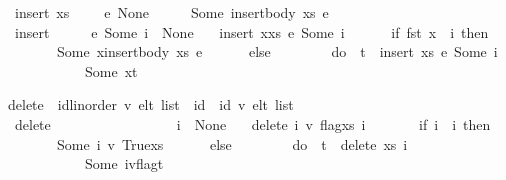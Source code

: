 \documentclass[acmlarge,review,anonymous]{acmart}\settopmatter{printfolios=true}
\begin{document}
\begin{isabellebody}
\ \ {\isachardoublequoteopen}insert\ xs\ \ \ \ \ e\ None\ \ \ \ \ {\isacharequal}\ Some\ {\isacharparenleft}insert{\isacharunderscore}body\ xs\ e{\isacharparenright}{\isachardoublequoteclose}\ {\isacharbar}\isanewline
\ \ {\isachardoublequoteopen}insert\ {\isacharbrackleft}{\isacharbrackright}\ \ \ \ \ e\ {\isacharparenleft}Some\ i{\isacharparenright}\ {\isacharequal}\ None{\isachardoublequoteclose}\ {\isacharbar}\isanewline
\ \ {\isachardoublequoteopen}insert\ {\isacharparenleft}x{\isacharhash}xs{\isacharparenright}\ e\ {\isacharparenleft}Some\ i{\isacharparenright}\ {\isacharequal}\isanewline
\ \ \ \ \ {\isacharparenleft}if\ fst\ x\ {\isacharequal}\ i\ then\isanewline
\ \ \ \ \ \ \ \ Some\ {\isacharparenleft}x{\isacharhash}insert{\isacharunderscore}body\ xs\ e{\isacharparenright}\isanewline
\ \ \ \ \ \ else\isanewline
\ \ \ \ \ \ \ \ do\ {\isacharbraceleft}\ t\ {\isasymleftarrow}\ insert\ xs\ e\ {\isacharparenleft}Some\ i{\isacharparenright}\isanewline
\ \ \ \ \ \ \ \ \ \ \ {\isacharsemicolon}\ Some\ {\isacharparenleft}x{\isacharhash}t{\isacharparenright}\isanewline
\ \ \ \ \ \ \ \ \ \ \ {\isacharbraceright}{\isacharparenright}{\isachardoublequoteclose}\isanewline
\end{isabellebody}



\begin{isabellebody}
\isanewline
{}\isamarkupfalse%
\ delete\ {\isacharcolon}{\isacharcolon}\ {\isachardoublequoteopen}{\isacharparenleft}{\isacharprime}id{\isacharcolon}{\isacharcolon}{\isacharbraceleft}linorder{\isacharbraceright}{\isacharcomma}\ {\isacharprime}v{\isacharparenright}\ elt\ list\ {\isasymRightarrow}\ {\isacharprime}id\ {\isasymrightharpoonup}\ {\isacharparenleft}{\isacharprime}id{\isacharcomma}\ {\isacharprime}v{\isacharparenright}\ elt\ list{\isachardoublequoteclose}\ \isanewline
\ \ {\isachardoublequoteopen}delete\ {\isacharbrackleft}{\isacharbrackright}\ \ \ \ \ \ \ \ \ \ \ \ \ \ \ \ \ i\ {\isacharequal}\ None{\isachardoublequoteclose}\ {\isacharbar}\isanewline
\ \ {\isachardoublequoteopen}delete\ {\isacharparenleft}{\isacharparenleft}i{\isacharprime}{\isacharcomma}\ v{\isacharcomma}\ flag{\isacharparenright}{\isacharhash}xs{\isacharparenright}\ i\ {\isacharequal}\ \isanewline
\ \ \ \ \ {\isacharparenleft}if\ i{\isacharprime}\ {\isacharequal}\ i\ then\isanewline
\ \ \ \ \ \ \ \ Some\ {\isacharparenleft}{\isacharparenleft}i{\isacharprime}{\isacharcomma}\ v{\isacharcomma}\ True{\isacharparenright}{\isacharhash}xs{\isacharparenright}\isanewline
\ \ \ \ \ \ else\isanewline
\ \ \ \ \ \ \ \ do\ {\isacharbraceleft}\ t\ {\isasymleftarrow}\ delete\ xs\ i\isanewline
\ \ \ \ \ \ \ \ \ \ \ {\isacharsemicolon}\ Some\ {\isacharparenleft}{\isacharparenleft}i{\isacharprime}{\isacharcomma}v{\isacharcomma}flag{\isacharparenright}{\isacharhash}t{\isacharparenright}\isanewline
\ \ \ \ \ \ \ \ \ \ \ {\isacharbraceright}{\isacharparenright}{\isachardoublequoteclose}%
\end{isabellebody}
\end{document}
